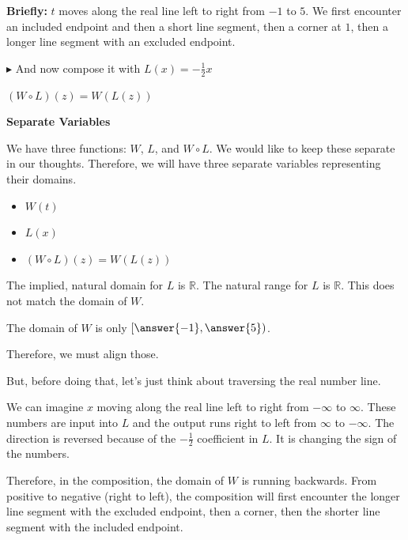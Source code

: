 \documentclass{ximera}
\begin{document}
\textbf{Briefly:} $t$ moves along the real line left to right from $-1$ to $5$. We first encounter an included endpoint and then a short line segment, then a corner at $1$, then a longer line segment with an excluded endpoint. 







$\blacktriangleright$ And now compose it with $L(x) = -\frac{1}{2}x$ 



$(W \circ L)(z) = W(L(z))$



\begin{explanation} \textbf{\textcolor{red!75!green}{Separate Variables}} 

We have three functions: $W$, $L$, and $W \circ L$.  We would like to keep these separate in our thoughts.  Therefore, we will have three separate variables representing their domains.


\begin{itemize}
\item $W(t)$
\item $L(x)$
\item $(W \circ L)(z) = W(L(z))$
\end{itemize}

\end{explanation}






The implied, natural domain for $L$ is \textbf{$\mathbb{R}$}.  The natural range for $L$ is \textbf{$\mathbb{R}$}. This does not match the domain of $W$.  


\begin{question}


The domain of $W$ is only $\left[ \answer{-1}, \answer{5} \right)$. 

\end{question}

Therefore, we must align those.

But, before doing that, let's just think about traversing the real number line. 

We can imagine $x$ moving along the real line left to right from $-\infty$ to $\infty$. These numbers are input into $L$ and the output runs right to left from $\infty$ to $-\infty$.  The direction is reversed because of the $-\frac{1}{2}$ coefficient in $L$.  It is changing the sign of the numbers.


Therefore, in the composition, the domain of $W$ is running backwards.  From positive to negative (right to left), the composition will first encounter the longer line segment with the excluded endpoint, then a corner, then the shorter line segment with the included endpoint.
\end{document}

